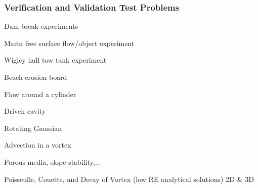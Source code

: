 \documentclass{beamer}
\begin{document}

\begin{frame}
  \frametitle{Verification and Validation Test Problems}
    \bit
  \item Dam break experiments
  \item Marin free surface flow/object experiment
  \item Wigley hull tow tank experiment
  \item Beach erosion board
  \item Flow around a cylinder
  \item Driven cavity
  \item Rotating Gaussian
  \item Advection in a vortex
  \item Porous media, slope stability,...
  \item Poisseulle, Couette, and Decay of Vortex (low RE analytical solutions) 2D \& 3D
    \eit
\end{frame}
\end{document}
